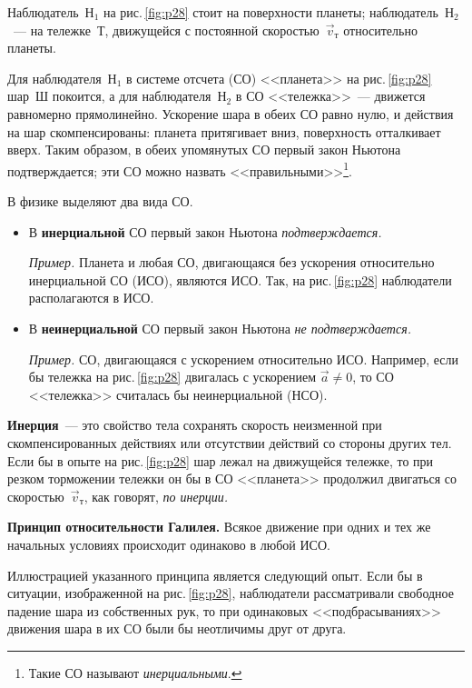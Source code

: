 \documentclass[main.tex]{subfiles}
\begin{document}
Наблюдатель~$\text{Н}_1$ на рис.\,\ref{fig:p28} стоит на поверхности планеты; наблюдатель~$\text{Н}_2$~--- на тележке~Т, движущейся с постоянной скоростью~$\vec v_\text{т}$ относительно планеты. 

Для наблюдателя~$\text{Н}_1$ в системе отсчета (СО) <<планета>> на рис.\,\ref{fig:p28} шар~Ш покоится, а для наблюдателя~$\text{Н}_2$ в СО <<тележка>>~--- движется равномерно прямолинейно. Ускорение шара в обеих СО равно нулю, и действия на шар скомпенсированы: планета притягивает вниз, поверхность отталкивает вверх. Таким образом, в обеих упомянутых СО первый закон Ньютона подтверждается; эти СО можно назвать <<правильными>>\footnote{Такие СО называют \emph{инерциальными}.}.

В физике выделяют два вида СО.
\begin{itemize}
    \item В \textbf{инерциальной} СО первый закон Ньютона \emph{подтверждается.}

    \emph{Пример.} Планета и любая СО, двигающаяся без ускорения относительно инерциальной СО (ИСО), являются ИСО. Так, на рис.\,\ref{fig:p28} наблюдатели располагаются в ИСО.

    \item В \textbf{неинерциальной} СО первый закон Ньютона \emph{не подтверждается.}

    \emph{Пример.} СО, двигающаяся с ускорением относительно ИСО. Например, если бы тележка на рис.\,\ref{fig:p28} двигалась с ускорением $\vec a\ne 0$, то СО <<тележка>> считалась бы неинерциальной (НСО).
    
\end{itemize}

\textbf{Инерция}~--- это свойство тела сохранять скорость неизменной при скомпенсированных действиях или отсутствии действий со стороны других тел. Если бы в опыте на рис.\,\ref{fig:p28} шар лежал на движущейся тележке, то при резком торможении тележки он бы в СО <<планета>> продолжил двигаться со скоростью~$\vec v_\text{т}$, как говорят, \emph{по инерции.} 

\begin{law}
\textbf{Принцип относительности Галилея.} Всякое движение при одних и тех же начальных условиях происходит одинаково в любой ИСО.
\end{law}

Иллюстрацией указанного принципа является  следующий опыт. Если бы в ситуации, изображенной на рис.\,\ref{fig:p28}, наблюдатели рассматривали свободное падение шара из собственных рук, то при одинаковых <<подбрасываниях>> движения шара в их СО были бы неотличимы друг от друга.  












 
\end{document}
